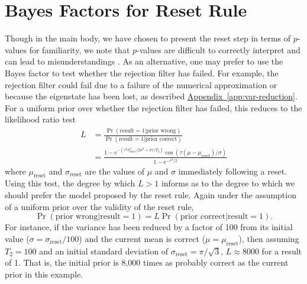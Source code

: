 \documentclass[aps,pra,amsmath,twocolumn,amssymb,superscriptaddress]{revtex4-1}
\newcommand{\reset}{\mathrm{reset}}
\newcommand{\app}[1]{\hyperref[app:#1]{Appendix~\ref*{app:#1}}}
\newcommand{\ee}{\mathrm{e}}
\begin{document}
\section{Bayes Factors for Reset Rule}
\label{app:bf}

Though in the main body, we have chosen to present the reset step in terms of
$p$-values for familiarity, we note that $p$-values are difficult to correctly
interpret and can lead to misunderstandings \cite{goodman_dirty_2008,hoekstra_robust_2014}. As an
alternative, one may prefer to use the Bayes factor to test whether the rejection
filter has failed. For example, the rejection filter could fail due to
a failure of the numerical approximation or because the eigenstate has
been lost, as described \app{var-reduction}. For a uniform prior over
whether the rejection filter has failed, this reduces to the likelihood
ratio test
\begin{subequations}
    \begin{align}
        L & = \frac{\Pr(\text{result} = 1 | \text{prior wrong})}{\Pr(\text{result} = 1 | \text{prior correct})} \\
          & = \frac{                  
                  1 - \ee^{
                          - (\tau^2 \sigma_\reset^2 / 2 \sigma^2 + \sigma \tau / T_2)
                      }
                      \cos \left(
                        \tau \left(\mu -\mu _\reset \right) / \sigma
                      \right)
              }{
                  1-\ee^{-\tau^2 / 2}
              }
    \end{align}
\end{subequations}
where $\mu_\reset$ and $\sigma_\reset$ are the values of $\mu$ and $\sigma$
immediately following a reset. Using this test, the degree by which $L > 1$
informs as to the degree to which we should prefer the model proposed by the
reset rule. Again under the assumption of a uniform prior over the
validity of the reset rule,
\begin{equation}
    \Pr(\text{prior wrong} | \text{result} = 1) = L \Pr(\text{prior correct} | \text{result} = 1).
\end{equation}
For instance, if the variance has been reduced by a factor of 100 from
its initial value ($\sigma = \sigma_\reset / 100$) and the current mean is
correct ($\mu = \mu_\reset$), then assuming $T_2 = 100$ and an initial standard
deviation of $\sigma_\reset = \pi / \sqrt{3}$, $L\approx8000$ for a result of
1. That is, the initial prior is 8,000 times as probably correct as the current
prior in this example.
\end{document}
